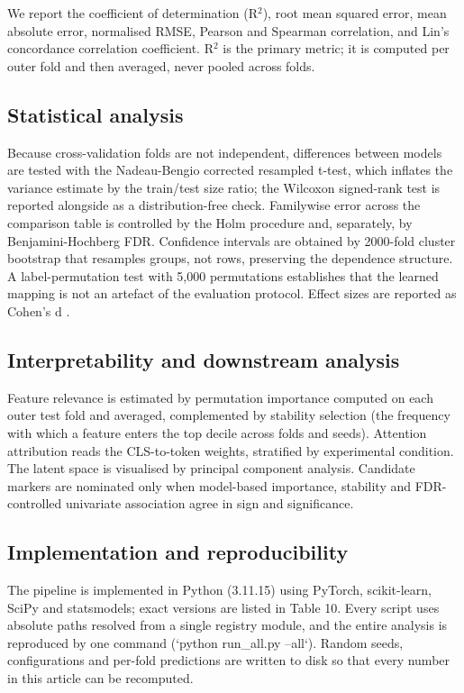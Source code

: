 \documentclass[utf8]{FrontiersinHarvard}
\begin{document}
We report the coefficient of determination (R$^2$), root mean squared error, mean absolute error, normalised RMSE, Pearson and Spearman correlation, and Lin's concordance correlation coefficient. R$^2$ is the primary metric; it is computed per outer fold and then averaged, never pooled across folds.


\subsection{Statistical analysis}

Because cross-validation folds are not independent, differences between models are tested with the Nadeau-Bengio corrected resampled t-test, which inflates the variance estimate by the train/test size ratio; the Wilcoxon signed-rank test is reported alongside as a distribution-free check. Familywise error across the comparison table is controlled by the Holm procedure and, separately, by Benjamini-Hochberg FDR. Confidence intervals are obtained by 2000-fold cluster bootstrap that resamples groups, not rows, preserving the dependence structure. A label-permutation test with 5,000 permutations establishes that the learned mapping is not an artefact of the evaluation protocol. Effect sizes are reported as Cohen's d \cite{nadeau2003inference,efron1994bootstrap}.


\subsection{Interpretability and downstream analysis}

Feature relevance is estimated by permutation importance computed on each outer test fold and averaged, complemented by stability selection (the frequency with which a feature enters the top decile across folds and seeds). Attention attribution reads the CLS-to-token weights, stratified by experimental condition. The latent space is visualised by principal component analysis. Candidate markers are nominated only when model-based importance, stability and FDR-controlled univariate association agree in sign and significance.


\subsection{Implementation and reproducibility}

The pipeline is implemented in Python (3.11.15) using PyTorch, scikit-learn, SciPy and statsmodels; exact versions are listed in Table 10. Every script uses absolute paths resolved from a single registry module, and the entire analysis is reproduced by one command (`python run_all.py --all`). Random seeds, configurations and per-fold predictions are written to disk so that every number in this article can be recomputed.
\end{document}
